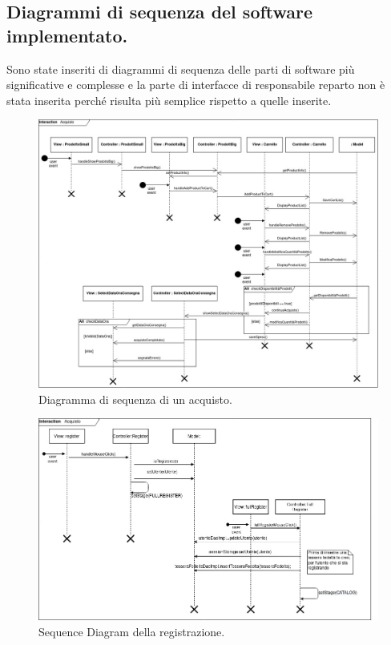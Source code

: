 \documentclass{article}
\begin{document}
\clearpage
\subsection{Diagrammi di sequenza del software implementato.}
Sono state inseriti di diagrammi di sequenza delle parti di software più significative e complesse e la parte di interfacce di responsabile reparto non è stata inserita perché risulta più semplice rispetto a quelle inserite.
\begin{figure}[h!]
	\centering
	\includegraphics[width=\textwidth]{SDAcquisto.jpg}
	\caption{Diagramma di sequenza di un acquisto.}
	\label{SDAcquisto.jpg}
	\newpage
\end{figure}
\begin{figure}[h!]
	\centering
	\includegraphics[width=\textwidth]{SequenceDiagramRegistrazione.jpg}
	\caption{Sequence Diagram della registrazione.}
	\label{fig:SequenceDiagramRegistrazione}
\end{figure}
\end{document}

